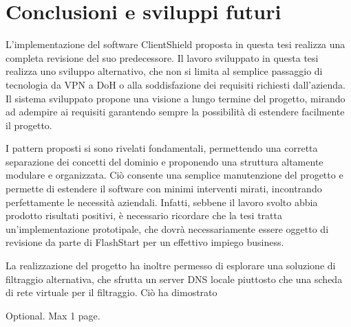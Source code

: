 \documentclass[12pt,a4paper,openright,twoside]{book}
\begin{document}
\chapter{Conclusioni e sviluppi futuri}

L'implementazione del software ClientShield proposta in questa tesi realizza una completa revisione del suo predecessore.
Il lavoro sviluppato in questa tesi realizza uno sviluppo alternativo, che non si limita al semplice passaggio di tecnologia da \gls{VPN} a \gls{DoH} o alla soddisfazione dei requisiti richiesti dall'azienda.
Il sistema sviluppato propone una visione a lungo termine del progetto, mirando ad adempire ai requisiti garantendo sempre la possibilità di estendere facilmente il progetto.

I pattern proposti si sono rivelati fondamentali, permettendo una corretta separazione dei concetti del dominio e proponendo una struttura altamente modulare e organizzata.
Ciò consente una semplice manutenzione del progetto e permette di estendere il software con minimi interventi mirati, incontrando perfettamente le necessità aziendali.
Infatti, sebbene il lavoro svolto abbia prodotto risultati positivi, è necessario ricordare che la tesi tratta un'implementazione prototipale, che dovrà necessariamente essere oggetto di revisione da parte di FlashStart per un effettivo impiego business.

La realizzazione del progetto ha inoltre permesso di esplorare una soluzione di filtraggio alternativa, che sfrutta un server \gls{DNS} locale piuttosto che una scheda di rete virtuale per il filtraggio.
Ciò ha dimostrato


\backmatter




\begin{acknowledgements} %
Optional. Max 1 page.
\end{acknowledgements}
\end{document}
